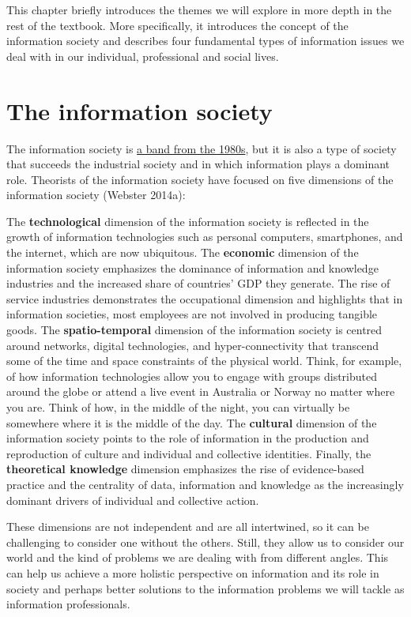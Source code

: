 \documentclass[
  letterpaper,
  DIV=11,
  numbers=noendperiod]{scrreprt}
\begin{document}
This chapter briefly introduces the themes we will explore in more depth
in the rest of the textbook. More specifically, it introduces the
concept of the information society and describes four fundamental types
of information issues we deal with in our individual, professional and
social lives.

\section{The information society}\label{the-information-society}

The information society is
\href{https://www.youtube.com/watch?v=ijAYN9zVnwg&ab_channel=infosocietyVEVO}{a
band from the 1980s}, but it is also a type of society that succeeds the
industrial society and in which information plays a dominant role.
Theorists of the information society have focused on five dimensions of
the information society (Webster 2014a):

The \textbf{technological} dimension of the information society is
reflected in the growth of information technologies such as personal
computers, smartphones, and the internet, which are now ubiquitous. The
\textbf{economic} dimension of the information society emphasizes the
dominance of information and knowledge industries and the increased
share of countries' GDP they generate. The rise of service industries
demonstrates the occupational dimension and highlights that in
information societies, most employees are not involved in producing
tangible goods. The \textbf{spatio-temporal} dimension of the
information society is centred around networks, digital technologies,
and hyper-connectivity that transcend some of the time and space
constraints of the physical world. Think, for example, of how
information technologies allow you to engage with groups distributed
around the globe or attend a live event in Australia or Norway no matter
where you are. Think of how, in the middle of the night, you can
virtually be somewhere where it is the middle of the day. The
\textbf{cultural} dimension of the information society points to the
role of information in the production and reproduction of culture and
individual and collective identities. Finally, the \textbf{theoretical
knowledge} dimension emphasizes the rise of evidence-based practice and
the centrality of data, information and knowledge as the increasingly
dominant drivers of individual and collective action.

These dimensions are not independent and are all intertwined, so it can
be challenging to consider one without the others. Still, they allow us
to consider our world and the kind of problems we are dealing with from
different angles. This can help us achieve a more holistic perspective
on information and its role in society and perhaps better solutions to
the information problems we will tackle as information professionals.
\end{document}

